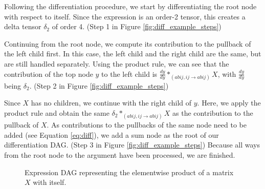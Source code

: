 \documentclass[12pt, a4paper]{report}
\begin{document}
Following the differentiation procedure, we start by differentiating the root node with respect to itself.
Since the expression is an order-2 tensor, this creates a delta tensor $\delta_2$ of order 4. (Step 1 in Figure \ref{fig:diff_example_steps})

Continuing from the root node, we compute its contribution to the pullback of the left child first.
In this case, the left child and the right child are the same, but are still handled separately.
Using the product rule, we can see that the contribution of the top node $y$ to the left child is $\frac{dy}{dy} *_{(abij,ij \rightarrow abij)} X$, with $\frac{dy}{dy}$ being $\delta_2$. (Step 2 in Figure \ref{fig:diff_example_steps})

Since $X$ has no children, we continue with the right child of $y$.
Here, we apply the product rule and obtain the same $\delta_2 *_{(abij,ij \rightarrow abij)} X$ as the contribution to the pullback of $X$.
As contributions to the pullbacks of the same node need to be added (see Equation \ref{eq:diff}), we add a sum node as the root of our differentiation DAG. (Step 3 in Figure \ref{fig:diff_example_steps})
Because all ways from the root node to the argument have been processed, we are finished.

\begin{figure}
    \centering
    \caption{Expression DAG representing the elementwise product of a matrix $X$ with itself.}
    \label{fig:diff_example_original}
\end{figure}
\end{document}
